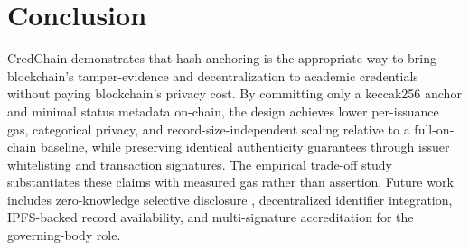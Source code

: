 \documentclass[conference]{IEEEtran}
\begin{document}
\section{Conclusion}
CredChain demonstrates that hash-anchoring is the appropriate way to bring blockchain's tamper-evidence and decentralization to academic credentials without paying blockchain's privacy cost. By committing only a keccak256 anchor and minimal status metadata on-chain, the design achieves lower per-issuance gas, categorical privacy, and record-size-independent scaling relative to a full-on-chain baseline, while preserving identical authenticity guarantees through issuer whitelisting and transaction signatures. The empirical trade-off study substantiates these claims with measured gas rather than assertion. Future work includes zero-knowledge selective disclosure \cite{berrios_zkbar}, decentralized identifier integration, IPFS-backed record availability, and multi-signature accreditation for the governing-body role.



\end{document}
